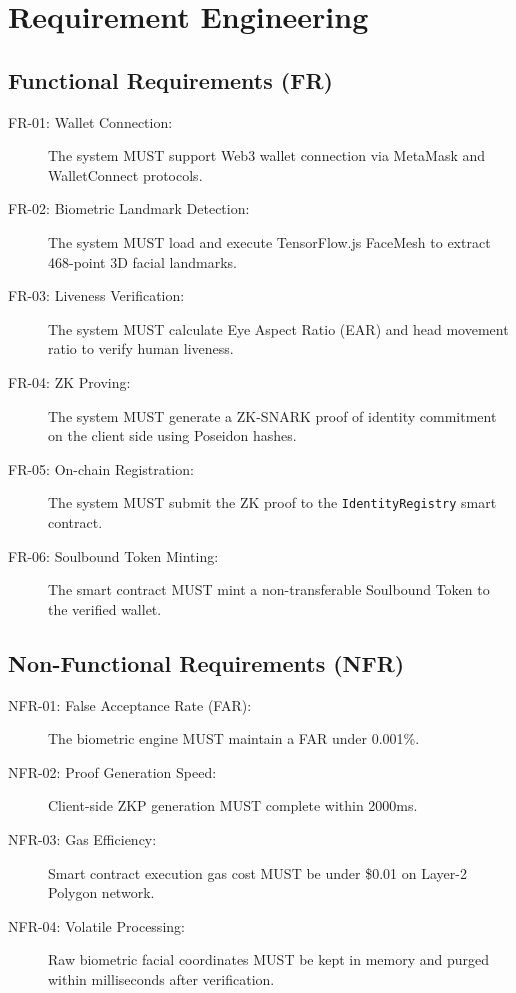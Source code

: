 \documentclass[12pt,a4paper,oneside]{report}
\begin{document}
\section{Requirement Engineering}

\subsection{Functional Requirements (FR)}
\begin{description}
    \item[FR-01: Wallet Connection:] The system MUST support Web3 wallet connection via MetaMask and WalletConnect protocols.
    \item[FR-02: Biometric Landmark Detection:] The system MUST load and execute TensorFlow.js FaceMesh to extract 468-point 3D facial landmarks.
    \item[FR-03: Liveness Verification:] The system MUST calculate Eye Aspect Ratio (EAR) and head movement ratio to verify human liveness.
    \item[FR-04: ZK Proving:] The system MUST generate a ZK-SNARK proof of identity commitment on the client side using Poseidon hashes.
    \item[FR-05: On-chain Registration:] The system MUST submit the ZK proof to the \texttt{IdentityRegistry} smart contract.
    \item[FR-06: Soulbound Token Minting:] The smart contract MUST mint a non-transferable Soulbound Token to the verified wallet.
\end{description}

\subsection{Non-Functional Requirements (NFR)}
\begin{description}
    \item[NFR-01: False Acceptance Rate (FAR):] The biometric engine MUST maintain a FAR under 0.001\%.
    \item[NFR-02: Proof Generation Speed:] Client-side ZKP generation MUST complete within 2000ms.
    \item[NFR-03: Gas Efficiency:] Smart contract execution gas cost MUST be under \$0.01 on Layer-2 Polygon network.
    \item[NFR-04: Volatile Processing:] Raw biometric facial coordinates MUST be kept in memory and purged within milliseconds after verification.
\end{description}
\end{document}
